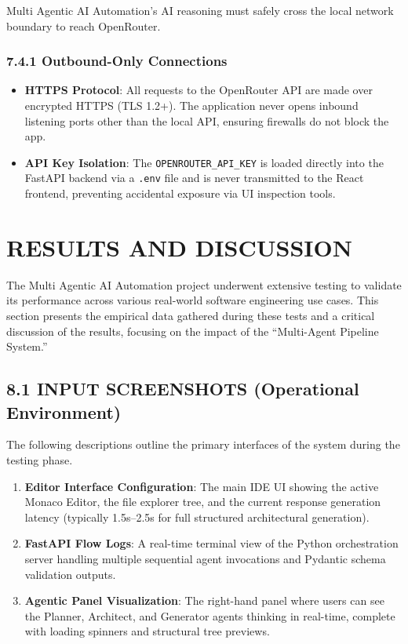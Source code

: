 \documentclass[
  12pt,
]{article}
\providecommand{\tightlist}{%
  \setlength{\itemsep}{0pt}\setlength{\parskip}{0pt}}
\begin{document}
Multi Agentic AI Automation's AI reasoning must safely cross the local
network boundary to reach OpenRouter.

\subsubsection{7.4.1 Outbound-Only
Connections}\label{outbound-only-connections}

\begin{itemize}
\tightlist
\item
  \textbf{HTTPS Protocol}: All requests to the OpenRouter API are made
  over encrypted HTTPS (TLS 1.2+). The application never opens inbound
  listening ports other than the local API, ensuring firewalls do not
  block the app.
\item
  \textbf{API Key Isolation}: The \texttt{OPENROUTER\_API\_KEY} is
  loaded directly into the FastAPI backend via a \texttt{.env} file and
  is never transmitted to the React frontend, preventing accidental
  exposure via UI inspection tools.
\end{itemize}

\newpage

\section{RESULTS AND DISCUSSION}\label{results-and-discussion}

The Multi Agentic AI Automation project underwent extensive testing to
validate its performance across various real-world software engineering
use cases. This section presents the empirical data gathered during
these tests and a critical discussion of the results, focusing on the
impact of the ``Multi-Agent Pipeline System.''

\subsection{8.1 INPUT SCREENSHOTS (Operational
Environment)}\label{input-screenshots-operational-environment}

The following descriptions outline the primary interfaces of the system
during the testing phase.

\begin{enumerate}
\def\labelenumi{\arabic{enumi}.}
\tightlist
\item
  \textbf{Editor Interface Configuration}: The main IDE UI showing the
  active Monaco Editor, the file explorer tree, and the current response
  generation latency (typically 1.5s--2.5s for full structured
  architectural generation).
\item
  \textbf{FastAPI Flow Logs}: A real-time terminal view of the Python
  orchestration server handling multiple sequential agent invocations
  and Pydantic schema validation outputs.
\item
  \textbf{Agentic Panel Visualization}: The right-hand panel where users
  can see the Planner, Architect, and Generator agents thinking in
  real-time, complete with loading spinners and structural tree
  previews.
\end{enumerate}
\end{document}
